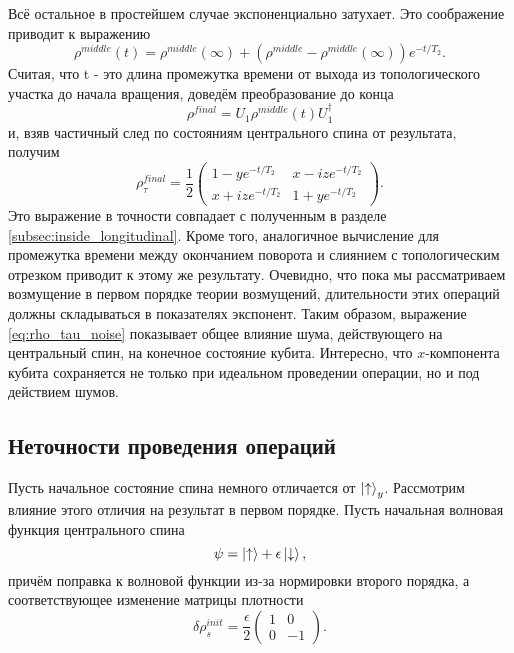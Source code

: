 \documentclass[a4paper,12pt]{article}
\theoremstyle{plain} %
\theoremstyle{definition} %
\theoremstyle{remark} %
\begin{document}
Всё остальное в простейшем случае экспоненциально затухает. Это соображение приводит к выражению
\begin{equation}
    \rho^{middle}(t) = \rho^{middle}(\infty) + (\rho^{middle} - \rho^{middle}(\infty)) e^{-t/T_2}.
\end{equation}
Считая, что t - это длина промежутка времени от выхода из топологического участка до начала вращения, доведём преобразование до конца
\begin{equation}
    \rho^{final} = U_1 \rho^{middle}(t) U_1^\dagger
\end{equation}
и, взяв частичный след по состояниям центрального спина от результата, получим
\begin{equation}
    \rho^{final}_\tau = \frac{1}{2}
    \begin{pmatrix}
        1 - y e^{-t/T_2} & x - i z e^{-t/T_2} \\
        x + i z e^{-t/T_2} & 1 + y e^{-t/T_2}
    \end{pmatrix}.
    \label{eq:rho_tau_noise}
\end{equation}
Это выражение в точности совпадает с полученным в разделе \ref{subsec:inside_longitudinal}. Кроме того, аналогичное вычисление для промежутка времени между окончанием поворота и слиянием с топологическим отрезком приводит к этому же результату. Очевидно, что пока мы рассматриваем возмущение в первом порядке теории возмущений, длительности этих операций должны складываться в показателях экспонент. Таким образом, выражение \ref{eq:rho_tau_noise} показывает общее влияние шума, действующего на центральный спин, на конечное состояние кубита. Интересно, что $x$-\hspace{0pt}компонента кубита сохраняется не только при идеальном проведении операции, но и под действием шумов.

\subsection{Неточности проведения операций} \label{subsec:operations}

Пусть начальное состояние спина немного отличается от $\ket{\uparrow}_y$. Рассмотрим влияние этого отличия на результат в первом порядке. 
Пусть начальная волновая функция центрального спина
\begin{equation}
    \psi = \ket{\uparrow} + \epsilon \ket{\downarrow},
\end{equation}
причём поправка к волновой функции из-за нормировки второго порядка, а соответствующее изменение матрицы плотности
\begin{equation}
    \delta\rho^{init}_s = \frac{\epsilon}{2}
    \begin{pmatrix}
        1 & 0 \\
        0 & -1 
    \end{pmatrix}.
\end{equation}
\end{document}
